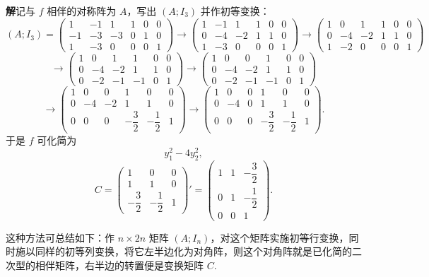 \documentclass[UTF8, 12pt, fontset=fandol, oneside]{ctexart}
\begin{document}
\noindent\textbf{解}\quad 记与 $f$ 相伴的对称阵为 $A$，写出 $(A;I_3)$ 并作初等变换：
\[
(A;I_3)=
\left(\begin{array}{ccc|ccc}
1&-1&1&1&0&0\\
-1&-3&-3&0&1&0\\
1&-3&0&0&0&1
\end{array}\right)\rightarrow
\left(\begin{array}{ccc|ccc}
1&-1&1&1&0&0\\
0&-4&-2&1&1&0\\
1&-3&0&0&0&1
\end{array}\right)\rightarrow
\left(\begin{array}{ccc|ccc}
1&0&1&1&0&0\\
0&-4&-2&1&1&0\\
1&-2&0&0&0&1
\end{array}\right)
\]
\[
\rightarrow
\left(\begin{array}{ccc|ccc}
1&0&1&1&0&0\\
0&-4&-2&1&1&0\\
0&-2&-1&-1&0&1
\end{array}\right)\rightarrow
\left(\begin{array}{ccc|ccc}
1&0&0&1&0&0\\
0&-4&-2&1&1&0\\
0&-2&-1&-1&0&1
\end{array}\right)
\]
\[
\rightarrow
\left(\begin{array}{ccc|ccc}
1&0&0&1&0&0\\
0&-4&-2&1&1&0\\
0&0&0&-\dfrac32&-\dfrac12&1
\end{array}\right)\rightarrow
\left(\begin{array}{ccc|ccc}
1&0&0&1&0&0\\
0&-4&0&1&1&0\\
0&0&0&-\dfrac32&-\dfrac12&1
\end{array}\right).
\]
于是 $f$ 可化简为
\[
y_1^2-4y_2^2,
\]
\[
C=\left(\begin{array}{ccc}
1&0&0\\
1&1&0\\
-\dfrac32&-\dfrac12&1
\end{array}\right)'
=
\left(\begin{array}{ccc}
1&1&-\dfrac32\\
0&1&-\dfrac12\\
0&0&1
\end{array}\right).
\]

这种方法可总结如下：作 $n\times 2n$ 矩阵 $(A;I_n)$，对这个矩阵实施初等行变换，同时施以同样的初等列变换，将它左半边化为对角阵，则这个对角阵就是已化简的二次型的相伴矩阵，右半边的转置便是变换矩阵 $C$.
\end{document}
